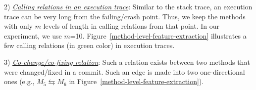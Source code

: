 
2) {\em \underline{Calling relations in an execution trace}}:
Similar to the stack trace, an execution trace can be very long from
the failing/crash point. Thus, we keep the methods with only $m$
levels of length in calling relations from that point. In our
experiment, we use
$m$=10. Figure~\ref{method-level-feature-extraction} illustrates a few
calling relations (in green color) in execution traces.

3) {\em \underline{Co-change/co-fixing relation}}: Such a relation
exists between two methods that were changed/fixed in a commit. Such
an edge is made into two one-directional ones (e.g., $M_5
\leftrightarrows M_6$ in
Figure~\ref{method-level-feature-extraction}).



